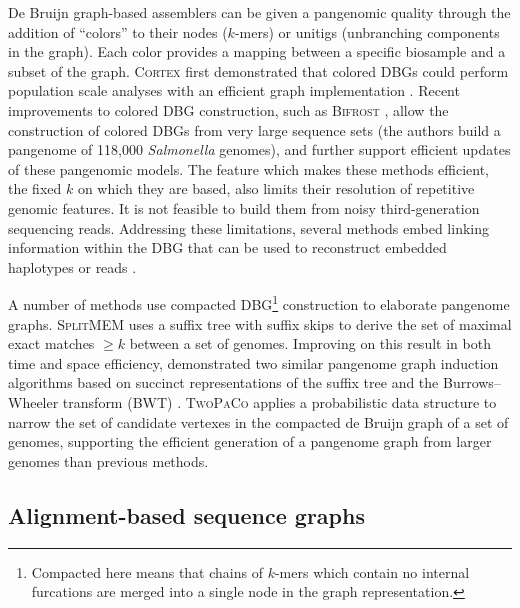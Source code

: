 De Bruijn graph-based assemblers can be given a pangenomic quality through the addition of ``colors'' to their nodes ($k$-mers) or unitigs (unbranching components in the graph).
Each color provides a mapping between a specific biosample and a subset of the graph.
\textsc{Cortex} first demonstrated that colored DBGs could perform population scale analyses with an efficient graph implementation \cite{Iqbal_2012}.
Recent improvements to colored DBG construction, such as \textsc{Bifrost} \cite{holley2019bifrost}, allow the construction of colored DBGs from very large sequence sets (the authors build a pangenome of 118,000 \emph{Salmonella} genomes), and further support efficient updates of these pangenomic models.
The feature which makes these methods efficient, the fixed $k$ on which they are based, also limits their resolution of repetitive genomic features.
It is not feasible to build them from noisy third-generation sequencing reads.
Addressing these limitations, several methods embed linking information within the DBG that can be used to reconstruct embedded haplotypes or reads \cite{Bolger_2017,Turner_2018}.

A number of methods use compacted DBG\footnote{Compacted here means that chains of $k$-mers which contain no internal furcations are merged into a single node in the graph representation.} construction to elaborate pangenome graphs.
\textsc{SplitMEM} \cite{Marcus_2014} uses a suffix tree with suffix skips to derive the set of maximal exact matches $\geq k$ between a set of genomes.
Improving on this result in both time and space efficiency, \cite{Baier_2015} demonstrated two similar pangenome graph induction algorithms based on succinct representations of the suffix tree and the Burrows--Wheeler transform (BWT) \cite{Burrows_1994}.
\textsc{TwoPaCo} \cite{Minkin_2016} applies a probabilistic data structure to narrow the set of candidate vertexes in the compacted de Bruijn graph of a set of genomes, supporting the efficient generation of a pangenome graph from larger genomes than previous methods.

\subsection{Alignment-based sequence graphs}
\label{sec:constructionWGA}

